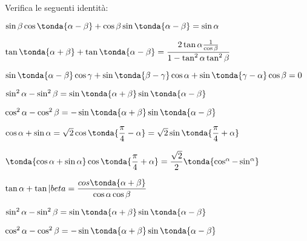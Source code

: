 \begin{esercizio}\label{ese:03.1}
Verifica le seguenti identità:
 \begin{enumeratea}
  \item $\sin \beta \cos \tonda{\alpha - \beta} +
         \cos \beta \sin \tonda{\alpha - \beta} = \sin \alpha$
  \item $\tan \tonda{\alpha + \beta} + \tan \tonda{\alpha - \beta} =
         \dfrac{2 \tan \alpha \frac{1}{\cos \beta}}
               {1- \tan^2 \alpha \tan^2 \beta}$
  \item $\sin \tonda{\alpha - \beta} \cos \gamma +
         \sin \tonda{\beta - \gamma} \cos \alpha +
         \sin \tonda{\gamma - \alpha} \cos \beta = 0$
  \item $\sin^2 \alpha  - \sin^2 \beta = 
         \sin \tonda{\alpha + \beta} \sin \tonda{\alpha - \beta}$
  \item $\cos^2 \alpha  - \cos^2 \beta = 
         - \sin \tonda{\alpha + \beta} \sin \tonda{\alpha - \beta}$
  \item $\cos \alpha + \sin \alpha = 
  \sqrt{2} \cos \tonda{\dfrac{\pi}{4} - \alpha} = 
  \sqrt{2} \sin \tonda{\dfrac{\pi}{4} + \alpha}$
  \item $\tonda{\cos \alpha + \sin \alpha} 
         \cos \tonda{\dfrac{\pi}{4} + \alpha} =
         \dfrac{\sqrt{2}}{2} \tonda{\cos^ \alpha - \sin^ \alpha}$
  \item $\tan \alpha + \tan |beta =
         \dfrac{cos \tonda{\alpha + \beta}}{\cos \alpha \cos \beta}$
  \item $\sin^2 \alpha - \sin^2 \beta =
         \sin \tonda{\alpha + \beta} \sin \tonda{\alpha - \beta}$
  \item $\cos^2 \alpha - \cos^2 \beta =
         - \sin \tonda{\alpha + \beta} \sin \tonda{\alpha - \beta}$
 \end{enumeratea}
\end{esercizio}

\subsubsection*{}

